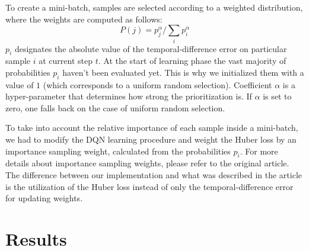 \documentclass[letterpaper]{article}
\begin{document}
To create a mini-batch, samples are selected according to a weighted distribution, where the weights are computed as follows:
\begin{equation}
    P(j) = p_j^{\alpha} / \sum_i p_i^{\alpha}
\end{equation}
$p_i$ designates the absolute value of the temporal-difference error on particular sample $i$ at current step $t$.
At the start of learning phase the vast majority of probabilities $p_i$ haven't been evaluated yet. This is why we initialized
them with a value of $1$ (which corresponds to a uniform random selection). Coefficient $\alpha$ is a hyper-parameter that
determines how strong the prioritization is. If $\alpha$ is set to zero, one falls back on the case of uniform random selection.

To take into account the relative importance of each sample inside a mini-batch, we had to modify the DQN learning procedure and weight the Huber loss
by an importance sampling weight, calculated from the probabilities $p_i$. For more details about importance sampling weights, please refer to the original
article. The difference between our implementation and what was described in the article is the utilization of the Huber loss instead of only
the temporal-difference error for updating weights.

\section{Results}
\end{document}
